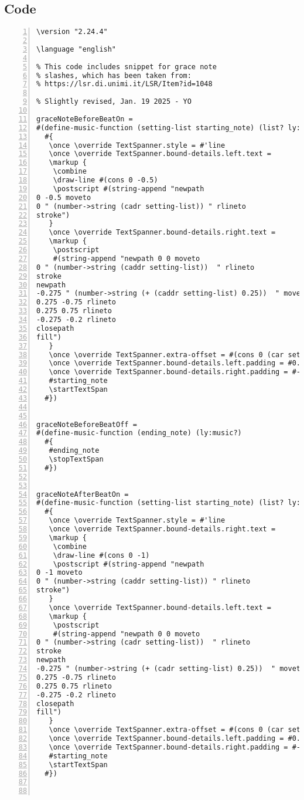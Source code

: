 \subsection{Code}
\begin{Verbatim}[numbers=left,xleftmargin=5mm]
\version "2.24.4"

\language "english"

% This code includes snippet for grace note
% slashes, which has been taken from:
% https://lsr.di.unimi.it/LSR/Item?id=1048

% Slightly revised, Jan. 19 2025 - YO

graceNoteBeforeBeatOn =
#(define-music-function (setting-list starting_note) (list? ly:music? )
  #{
   \once \override TextSpanner.style = #'line
   \once \override TextSpanner.bound-details.left.text =
   \markup {
    \combine
    \draw-line #(cons 0 -0.5)
    \postscript #(string-append "newpath 
0 -0.5 moveto 
0 " (number->string (cadr setting-list)) " rlineto 
stroke")
   }
   \once \override TextSpanner.bound-details.right.text =
   \markup {
    \postscript
    #(string-append "newpath 0 0 moveto 
0 " (number->string (caddr setting-list))  " rlineto 
stroke 
newpath 
-0.275 " (number->string (+ (caddr setting-list) 0.25))  " moveto 
0.275 -0.75 rlineto 
0.275 0.75 rlineto 
-0.275 -0.2 rlineto 
closepath 
fill")
   }
   \once \override TextSpanner.extra-offset = #(cons 0 (car setting-list))
   \once \override TextSpanner.bound-details.left.padding = #0.5
   \once \override TextSpanner.bound-details.right.padding = #-0.25
   #starting_note
   \startTextSpan
  #})


graceNoteBeforeBeatOff =
#(define-music-function (ending_note) (ly:music?)
  #{
   #ending_note
   \stopTextSpan
  #})


graceNoteAfterBeatOn =
#(define-music-function (setting-list starting_note) (list? ly:music?)
  #{
   \once \override TextSpanner.style = #'line
   \once \override TextSpanner.bound-details.right.text =
   \markup {
    \combine
    \draw-line #(cons 0 -1)
    \postscript #(string-append "newpath 
0 -1 moveto 
0 " (number->string (caddr setting-list)) " rlineto 
stroke")
   }
   \once \override TextSpanner.bound-details.left.text =
   \markup {
    \postscript
    #(string-append "newpath 0 0 moveto 
0 " (number->string (cadr setting-list))  " rlineto 
stroke 
newpath 
-0.275 " (number->string (+ (cadr setting-list) 0.25))  " moveto 
0.275 -0.75 rlineto 
0.275 0.75 rlineto 
-0.275 -0.2 rlineto 
closepath 
fill")
   }
   \once \override TextSpanner.extra-offset = #(cons 0 (car setting-list))
   \once \override TextSpanner.bound-details.left.padding = #0.5
   \once \override TextSpanner.bound-details.right.padding = #-0.25
   #starting_note
   \startTextSpan
  #})



\end{Verbatim}
